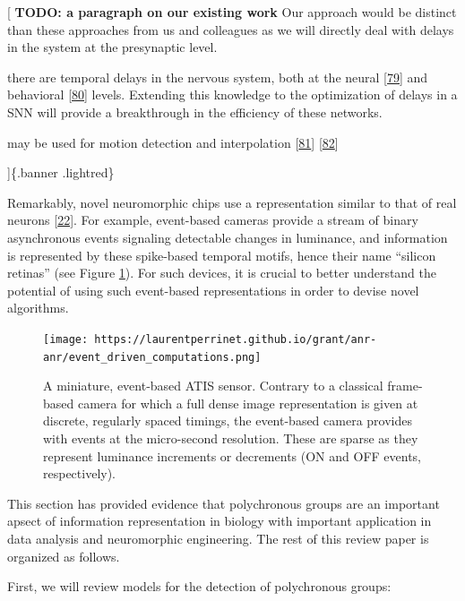 {[}
\textbf{TODO: a paragraph on our existing work}
Our approach would be distinct than these approaches from us and colleagues as we will directly deal with delays in the system at the presynaptic level.

there are temporal delays in the nervous system, both at the neural {[}\protect\hyperlink{ref-f7gkBktf}{79}{]} and behavioral {[}\protect\hyperlink{ref-1BSbXPPDF}{80}{]} levels. Extending this knowledge to the optimization of delays in a SNN will provide a breakthrough in the efficiency of these networks.

may be used for motion detection and interpolation {[}\protect\hyperlink{ref-WGEaBYgy}{81}{]} {[}\protect\hyperlink{ref-7GEdzh5o}{82}{]}

{]}\{.banner .lightred\}

Remarkably, novel neuromorphic chips use a representation similar to that of real neurons {[}\protect\hyperlink{ref-Oet1bgdb}{22}{]}. For example, event-based cameras provide a stream of binary asynchronous events signaling detectable changes in luminance, and information is represented by these spike-based temporal motifs, hence their name ``silicon retinas'' (see Figure \ref{fig:silicon_retina}). For such devices, it is crucial to better understand the potential of using such event-based representations in order to devise novel algorithms.

\begin{figure}
\hypertarget{fig:silicon_retina}{%
\centering
\texttt{[image: https://laurentperrinet.github.io/grant/anr-anr/event\_driven\_computations.png]}
\caption{A miniature, event-based ATIS sensor. Contrary to a classical frame-based camera for which a full dense image representation is given at discrete, regularly spaced timings, the event-based camera provides with events at the micro-second resolution. These are sparse as they represent luminance increments or decrements (ON and OFF events, respectively).}\label{fig:silicon_retina}
}
\end{figure}

This section has provided evidence that polychronous groups are an important apsect of information representation in biology with important application in data analysis and neuromorphic engineering. The rest of this review paper is organized as follows.

First, we will review models for the detection of polychronous groups:

